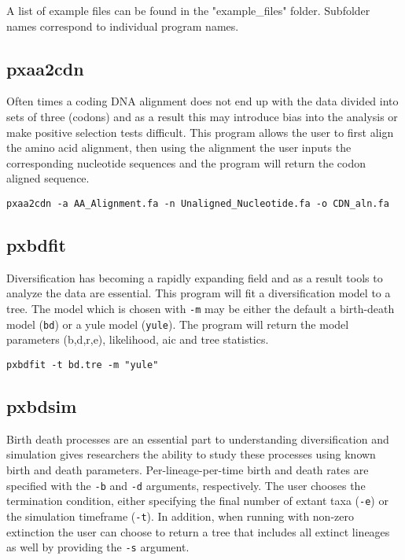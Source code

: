 \documentclass[12pt,letterpaper]{memoir}
\begin{document}
A list of example files can be found in the "example\_files" folder. Subfolder names correspond to individual program names.

\subsection{pxaa2cdn}

Often times a coding DNA alignment does not end up with the data divided into sets of three (codons) and as a result this may introduce bias into the analysis or make positive selection tests difficult. This program allows the user to first align the amino acid alignment, then using the alignment the user inputs the corresponding nucleotide sequences and the program will return the codon aligned sequence.
\begin{flushleft}
\begin{verbatim}
pxaa2cdn -a AA_Alignment.fa -n Unaligned_Nucleotide.fa -o CDN_aln.fa
\end{verbatim}
\end{flushleft}

\subsection{pxbdfit}

Diversification has becoming a rapidly expanding field and as a result tools to analyze the data are essential. This program will fit a diversification model to a tree. The model which is chosen with \texttt{-m} may be either the default a birth-death model (\texttt{bd}) or a yule model (\texttt{yule}). The program will return the model parameters (b,d,r,e), likelihood, aic and tree statistics.
\begin{flushleft}
\begin{verbatim}
pxbdfit -t bd.tre -m "yule"
\end{verbatim}
\end{flushleft}

\subsection{pxbdsim}

Birth death processes are an essential part to understanding diversification and simulation gives researchers the ability to study these processes using known birth and death parameters. Per-lineage-per-time birth and death rates are specified with the \texttt{-b} and \texttt{-d} arguments, respectively. The user chooses the termination condition, either specifying the final number of extant taxa (\texttt{-e}) or the simulation timeframe (\texttt{-t}). In addition, when running with non-zero extinction the user can choose to return a tree that includes all extinct lineages as well by providing the \texttt{-s} argument.
\end{document}
